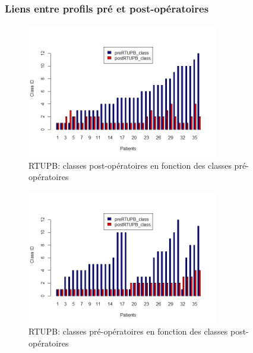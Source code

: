 %

\subsubsection{Liens entre profils pré et post-opératoires}

\begin{figure}[H]
\centering
\includegraphics[width=0.75\textwidth]{../Fig/RTUPB/rtupb-histogram-pre-post.png}
\caption{RTUPB: classes post-opératoires en fonction des classes pré-opératoires}
\label{fig-rtupb-histogram}
\end{figure}

\begin{figure}[H]
\centering
\includegraphics[width=0.75\textwidth]{../Fig/RTUPB/rtupb-histogram-post-pre.png}
\caption{RTUPB: classes pré-opératoires en fonction des classes post-opératoires}
\label{fig-rtupb-histogram2}
\end{figure}

